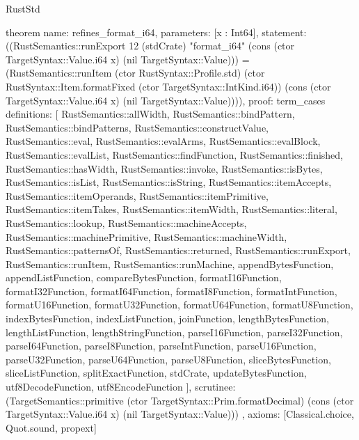 \begin{lexlean}{RustStd}
\begin{semanticmodule}
theorem{
  name: refines_format_i64,
  parameters: [x : Int64],
  statement: ((RustSemantics::runExport 12 (stdCrate) "format_i64" (cons (ctor TargetSyntax::Value.i64 x) (nil TargetSyntax::Value))) = (RustSemantics::runItem (ctor RustSyntax::Profile.std) (ctor RustSyntax::Item.formatFixed (ctor TargetSyntax::IntKind.i64)) (cons (ctor TargetSyntax::Value.i64 x) (nil TargetSyntax::Value)))),
  proof: term_cases{
    definitions: [
      RustSemantics::allWidth,
      RustSemantics::bindPattern,
      RustSemantics::bindPatterns,
      RustSemantics::constructValue,
      RustSemantics::eval,
      RustSemantics::evalArms,
      RustSemantics::evalBlock,
      RustSemantics::evalList,
      RustSemantics::findFunction,
      RustSemantics::finished,
      RustSemantics::hasWidth,
      RustSemantics::invoke,
      RustSemantics::isBytes,
      RustSemantics::isList,
      RustSemantics::isString,
      RustSemantics::itemAccepts,
      RustSemantics::itemOperands,
      RustSemantics::itemPrimitive,
      RustSemantics::itemTakes,
      RustSemantics::itemWidth,
      RustSemantics::literal,
      RustSemantics::lookup,
      RustSemantics::machineAccepts,
      RustSemantics::machinePrimitive,
      RustSemantics::machineWidth,
      RustSemantics::patternsOf,
      RustSemantics::returned,
      RustSemantics::runExport,
      RustSemantics::runItem,
      RustSemantics::runMachine,
      appendBytesFunction,
      appendListFunction,
      compareBytesFunction,
      formatI16Function,
      formatI32Function,
      formatI64Function,
      formatI8Function,
      formatIntFunction,
      formatU16Function,
      formatU32Function,
      formatU64Function,
      formatU8Function,
      indexBytesFunction,
      indexListFunction,
      joinFunction,
      lengthBytesFunction,
      lengthListFunction,
      lengthStringFunction,
      parseI16Function,
      parseI32Function,
      parseI64Function,
      parseI8Function,
      parseIntFunction,
      parseU16Function,
      parseU32Function,
      parseU64Function,
      parseU8Function,
      sliceBytesFunction,
      sliceListFunction,
      splitExactFunction,
      stdCrate,
      updateBytesFunction,
      utf8DecodeFunction,
      utf8EncodeFunction
    ],
    scrutinee: (TargetSemantics::primitive (ctor TargetSyntax::Prim.formatDecimal) (cons (ctor TargetSyntax::Value.i64 x) (nil TargetSyntax::Value)))
  },
  axioms: [Classical.choice, Quot.sound, propext]
}


\end{semanticmodule}
\end{lexlean}
